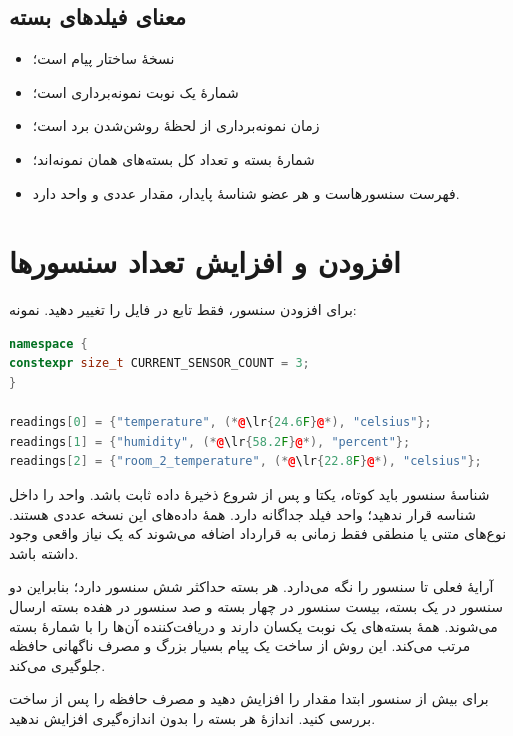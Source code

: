 \subsection{معنای فیلدهای بسته}
\begin{itemize}
  \item
  نسخهٔ ساختار پیام است؛
  \item
  شمارهٔ یک نوبت نمونه‌برداری است؛
  \item
  زمان نمونه‌برداری از لحظهٔ روشن‌شدن برد است؛
  \item
  شمارهٔ بسته و
  تعداد کل بسته‌های همان نمونه‌اند؛
  \item
  فهرست سنسورهاست و هر عضو شناسهٔ پایدار، مقدار عددی و واحد دارد.
\end{itemize}

\section{افزودن و افزایش تعداد سنسورها}
برای افزودن سنسور، فقط تابع
در فایل
را تغییر دهید. نمونه:

\begin{LTR}
\begin{lstlisting}[language=C++]
namespace {
constexpr size_t CURRENT_SENSOR_COUNT = 3;
}

readings[0] = {"temperature", (*@\lr{24.6F}@*), "celsius"};
readings[1] = {"humidity", (*@\lr{58.2F}@*), "percent"};
readings[2] = {"room_2_temperature", (*@\lr{22.8F}@*), "celsius"};
\end{lstlisting}
\end{LTR}

شناسهٔ سنسور باید کوتاه، یکتا و پس از شروع ذخیرهٔ داده ثابت باشد. واحد را داخل شناسه قرار ندهید؛ واحد فیلد جداگانه دارد. همهٔ داده‌های این نسخه عددی هستند. نوع‌های متنی یا منطقی فقط زمانی به قرارداد اضافه می‌شوند که یک نیاز واقعی وجود داشته باشد.

آرایهٔ فعلی تا
سنسور را نگه می‌دارد. هر بسته حداکثر شش سنسور دارد؛ بنابراین دو سنسور در یک بسته، بیست سنسور در چهار بسته و صد سنسور در هفده بسته ارسال می‌شوند. همهٔ بسته‌های یک نوبت
یکسان دارند و دریافت‌کننده آن‌ها را با شمارهٔ بسته مرتب می‌کند. این روش از ساخت یک پیام بسیار بزرگ و مصرف ناگهانی حافظه جلوگیری می‌کند.

برای بیش از
سنسور ابتدا مقدار
را افزایش دهید و مصرف حافظه را پس از ساخت بررسی کنید. اندازهٔ هر بسته را بدون اندازه‌گیری افزایش ندهید.

